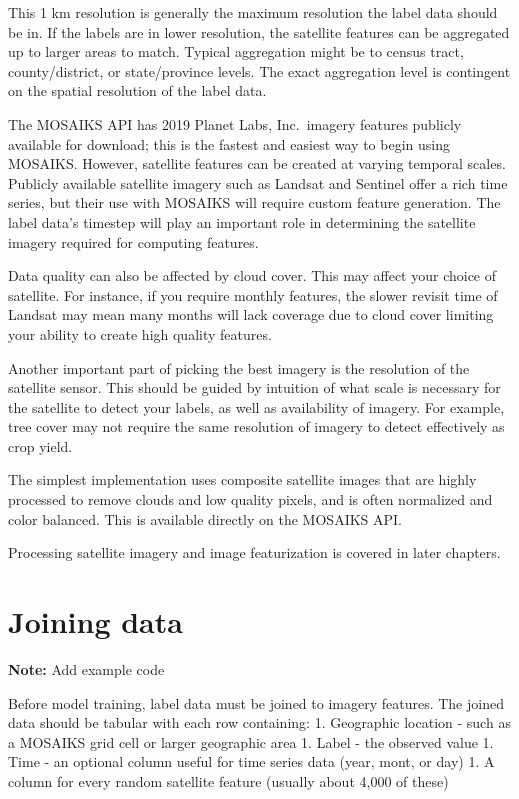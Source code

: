 \documentclass[
  letterpaper,
  DIV=11,
  numbers=noendperiod]{scrreprt}
\begin{document}
This 1 km resolution is generally the maximum resolution the label data
should be in. If the labels are in lower resolution, the satellite
features can be aggregated up to larger areas to match. Typical
aggregation might be to census tract, county/district, or state/province
levels. The exact aggregation level is contingent on the spatial
resolution of the label data.

The MOSAIKS API has 2019 Planet Labs, Inc.~imagery features publicly
available for download; this is the fastest and easiest way to begin
using MOSAIKS. However, satellite features can be created at varying
temporal scales. Publicly available satellite imagery such as Landsat
and Sentinel offer a rich time series, but their use with MOSAIKS will
require custom feature generation. The label data's timestep will play
an important role in determining the satellite imagery required for
computing features.

Data quality can also be affected by cloud cover. This may affect your
choice of satellite. For instance, if you require monthly features, the
slower revisit time of Landsat may mean many months will lack coverage
due to cloud cover limiting your ability to create high quality
features.

Another important part of picking the best imagery is the resolution of
the satellite sensor. This should be guided by intuition of what scale
is necessary for the satellite to detect your labels, as well as
availability of imagery. For example, tree cover may not require the
same resolution of imagery to detect effectively as crop yield.

The simplest implementation uses composite satellite images that are
highly processed to remove clouds and low quality pixels, and is often
normalized and color balanced. This is available directly on the MOSAIKS
API.

Processing satellite imagery and image featurization is covered in later
chapters.

\hypertarget{joining-data}{%
\section*{Joining data}\label{joining-data}}


\textbf{Note:} Add example code

Before model training, label data must be joined to imagery features.
The joined data should be tabular with each row containing: 1.
Geographic location - such as a MOSAIKS grid cell or larger geographic
area 1. Label - the observed value 1. Time - an optional column useful
for time series data (year, mont, or day) 1. A column for every random
satellite feature (usually about 4,000 of these)
\end{document}

